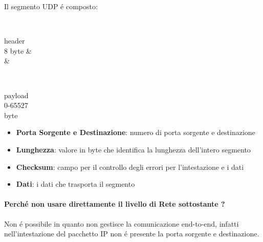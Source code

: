 \documentclass[12pt]{article}
\begin{document}
Il segmento UDP \'e composto:
\begin{center}
\begin{bytefield}[boxformatting={\centering},bitwidth=1.0em, bitheight=2em]{32}
	 \\
	\begin{rightwordgroup}{header\\8 byte}
		 & \\
		      & 
	\end{rightwordgroup}\\
	\begin{rightwordgroup}{payload\\0-65527\\byte}
	\end{rightwordgroup}
\end{bytefield}
\end{center}

\begin{itemize}[noitemsep]
    \item \textbf{Porta Sorgente e Destinazione}: numero di porta sorgente e destinazione
    \item \textbf{Lunghezza}: valore in byte che identifica la lunghezza dell'intero segmento
    \item \textbf{Checksum}: campo per il controllo degli errori per l'intestazione e i dati
    \item \textbf{Dati}: i dati che trasporta il segmento
\end{itemize}

\paragraph{Perch\'e non usare direttamente il livello di Rete sottostante ?} Non \'e possibile in quanto non gestisce 
la comunicazione end-to-end, infatti nell'intestazione del pacchetto IP non \'e presente la porta sorgente e 
destinazione. 
\end{document}
